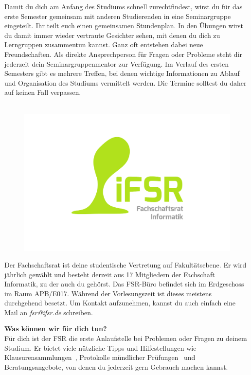 \pagebreak

\label{sec:seminargruppen}
Damit du dich am Anfang des Studiums schnell zurechtfindest, wirst du für das erste Semester gemeinsam mit anderen Studierenden in eine Seminargruppe eingeteilt.
Ihr teilt euch einen gemeinsamen Stundenplan.
In den Übungen wirst du damit immer wieder vertraute Gesichter sehen, mit denen du dich zu Lerngruppen zusammentun kannst.
Ganz oft entstehen dabei neue Freundschaften.
Als direkte Ansprechperson für Fragen oder Probleme steht dir jederzeit dein Seminargruppenmentor zur Verfügung.
Im Verlauf des ersten Semesters gibt es mehrere Treffen, bei denen wichtige Informationen zu Ablauf und Organisation des Studiums vermittelt werden. Die Termine solltest du daher auf keinen Fall verpassen.


\label{sec:fachschaftsrat}
\begin{figure}\ \\[-1cm]
\flushright\includegraphics[width=\linewidth, trim=160 150 150 50, clip]{img/fsr_logo}
\end{figure}

Der Fachschaftsrat ist deine studentische Vertretung auf Fakultätsebene.
Er wird jährlich gewählt und besteht derzeit aus 17 Mitgliedern der Fachschaft Informatik, zu der auch du gehörst.
Das FSR-Büro befindet sich im Erdgeschoss im Raum APB/E017.
Während der Vorlesungszeit ist dieses meistens durchgehend besetzt.
Um Kontakt aufzunehmen, kannst du auch einfach eine Mail an \textit{fsr@ifsr.de} schreiben.

\textbf{Was können wir für dich tun?} \\
Für dich ist der FSR die erste Anlaufstelle bei Problemen oder Fragen zu deinem Studium. Er bietet viele nützliche Tipps und Hilfestellungen wie Klausurensammlungen~, Protokolle mündlicher Prüfungen~ und Beratungsangebote, von denen du jederzeit gern Gebrauch machen kannst.

